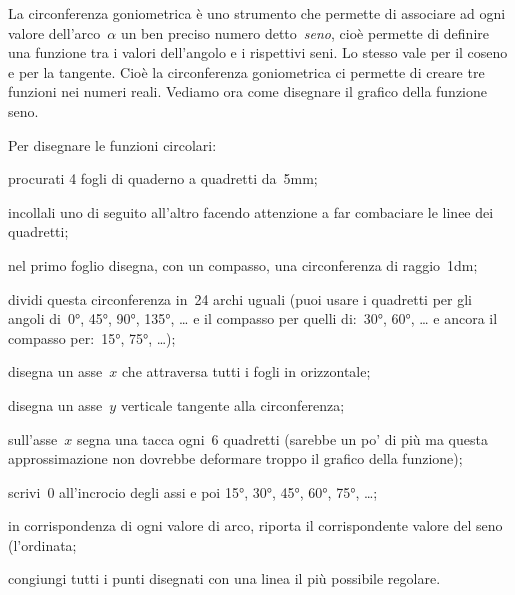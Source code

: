 La circonferenza goniometrica è uno strumento che permette di associare ad 
ogni valore dell'arco~$\alpha$ un ben preciso numero detto~\emph{seno},
cioè permette di definire una funzione tra i valori dell'angolo e i rispettivi
seni. Lo stesso vale per il coseno e per la tangente. 
Cioè la circonferenza goniometrica ci permette di creare tre funzioni nei 
numeri reali. Vediamo ora come disegnare il grafico della funzione seno.

\begin{procedura}
 Per disegnare le funzioni circolari:
 \begin{enumeratea}
  \item procurati 4 fogli di quaderno a quadretti da~5mm;
  \item incollali uno di seguito all'altro 
   facendo attenzione a far combaciare le linee dei quadretti;
  \item nel primo foglio disegna, con un compasso, una circonferenza di
   raggio~1dm;
  \item dividi questa circonferenza in~24 archi uguali 
   (puoi usare i quadretti per gli angoli di~0°, 45°, 90°, 135°, \dots 
   e il compasso per quelli di:~30°, 60°, \dots
   e ancora il compasso per:~15°, 75°, \dots);
  \item disegna un asse~$x$ che attraversa tutti i fogli in orizzontale;
  \item disegna un asse~$y$ verticale tangente alla circonferenza;
  \item sull'asse~$x$ segna una tacca ogni~6 quadretti 
   (sarebbe un po' di più ma questa approssimazione non dovrebbe deformare 
   troppo il grafico della funzione);
  \item scrivi~0 all'incrocio degli assi e poi 15°, 30°, 45°, 60°, 75°, \dots;
  \item in corrispondenza di ogni valore di arco, riporta il corrispondente
   valore del seno (l'ordinata;
  \item congiungi tutti i punti disegnati con una linea il più possibile 
   regolare.
 \end{enumeratea}
\end{procedura}

 \vspace{-6pt}
  \begin{center}
\begin{inaccessibleblock}
    
\end{inaccessibleblock}
  \end{center}

